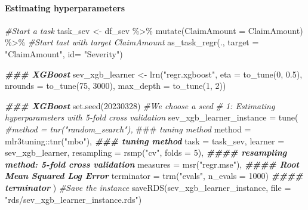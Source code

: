 \documentclass[
]{article}
\newenvironment{Shaded}{\begin{snugshade}}{\end{snugshade}}
\newcommand{\AlertTok}[1]{\textcolor[rgb]{0.94,0.16,0.16}{#1}}
\newcommand{\AttributeTok}[1]{\textcolor[rgb]{0.77,0.63,0.00}{#1}}
\newcommand{\CommentTok}[1]{\textcolor[rgb]{0.56,0.35,0.01}{\textit{#1}}}
\newcommand{\DecValTok}[1]{\textcolor[rgb]{0.00,0.00,0.81}{#1}}
\newcommand{\DocumentationTok}[1]{\textcolor[rgb]{0.56,0.35,0.01}{\textbf{\textit{#1}}}}
\newcommand{\FloatTok}[1]{\textcolor[rgb]{0.00,0.00,0.81}{#1}}
\newcommand{\FunctionTok}[1]{\textcolor[rgb]{0.00,0.00,0.00}{#1}}
\newcommand{\NormalTok}[1]{#1}
\newcommand{\OtherTok}[1]{\textcolor[rgb]{0.56,0.35,0.01}{#1}}
\newcommand{\SpecialCharTok}[1]{\textcolor[rgb]{0.00,0.00,0.00}{#1}}
\newcommand{\StringTok}[1]{\textcolor[rgb]{0.31,0.60,0.02}{#1}}
\begin{document}
\hypertarget{estimating-hyperparameters}{%
\paragraph{Estimating
hyperparameters}\label{estimating-hyperparameters}}

\begin{Shaded}
\begin{Highlighting}[]
\CommentTok{\#Start a task}
\NormalTok{task\_sev }\OtherTok{\textless{}{-}}\NormalTok{ df\_sev }\SpecialCharTok{\%\textgreater{}\%}
  \FunctionTok{mutate}\NormalTok{(}\AttributeTok{ClaimAmount =}\NormalTok{ ClaimAmount) }\SpecialCharTok{\%\textgreater{}\%}
  \CommentTok{\#Start tast with target ClaimAmount}
  \FunctionTok{as\_task\_regr}\NormalTok{(.,}
               \AttributeTok{target =} \StringTok{"ClaimAmount"}\NormalTok{,}
               \AttributeTok{id=} \StringTok{"Severity"}\NormalTok{)}

\DocumentationTok{\#\#\# XGBoost}
\NormalTok{sev\_xgb\_learner }\OtherTok{\textless{}{-}} \FunctionTok{lrn}\NormalTok{(}\StringTok{"regr.xgboost"}\NormalTok{,}
                   \AttributeTok{eta =} \FunctionTok{to\_tune}\NormalTok{(}\DecValTok{0}\NormalTok{, }\FloatTok{0.5}\NormalTok{),}
                   \AttributeTok{nrounds =} \FunctionTok{to\_tune}\NormalTok{(}\DecValTok{75}\NormalTok{, }\DecValTok{3000}\NormalTok{),}
                   \AttributeTok{max\_depth =} \FunctionTok{to\_tune}\NormalTok{(}\DecValTok{1}\NormalTok{, }\DecValTok{2}\NormalTok{))}

\DocumentationTok{\#\#\# XGBoost}
\FunctionTok{set.seed}\NormalTok{(}\DecValTok{20230328}\NormalTok{) }\CommentTok{\#We choose a seed}
\CommentTok{\# 1: Estimating hyperparameters with 5{-}fold cross validation}
\NormalTok{sev\_xgb\_learner\_instance }\OtherTok{=} \FunctionTok{tune}\NormalTok{(}
  \CommentTok{\#method = tnr("random\_search"), }\AlertTok{\#\#\#}\CommentTok{ tuning method}
  \AttributeTok{method =}\NormalTok{ mlr3tuning}\SpecialCharTok{::}\FunctionTok{tnr}\NormalTok{(}\StringTok{"mbo"}\NormalTok{), }\DocumentationTok{\#\#\# tuning method}
  \AttributeTok{task =}\NormalTok{ task\_sev,}
  \AttributeTok{learner =}\NormalTok{ sev\_xgb\_learner,}
  \AttributeTok{resampling =} \FunctionTok{rsmp}\NormalTok{(}\StringTok{"cv"}\NormalTok{, }\AttributeTok{folds =} \DecValTok{5}\NormalTok{), }\DocumentationTok{\#\#\#\# resampling method: 5{-}fold cross validation}
  \AttributeTok{measures =} \FunctionTok{msr}\NormalTok{(}\StringTok{"regr.mse"}\NormalTok{), }\DocumentationTok{\#\#\#\# Root Mean Squared Log Error}
  \AttributeTok{terminator =} \FunctionTok{trm}\NormalTok{(}\StringTok{"evals"}\NormalTok{, }\AttributeTok{n\_evals =} \DecValTok{1000}\NormalTok{) }\DocumentationTok{\#\#\#\# terminator}
\NormalTok{)}
\CommentTok{\#Save the instance}
\FunctionTok{saveRDS}\NormalTok{(sev\_xgb\_learner\_instance, }\AttributeTok{file =} \StringTok{"rds/sev\_xgb\_learner\_instance.rds"}\NormalTok{)}
\end{Highlighting}
\end{Shaded}
\end{document}
